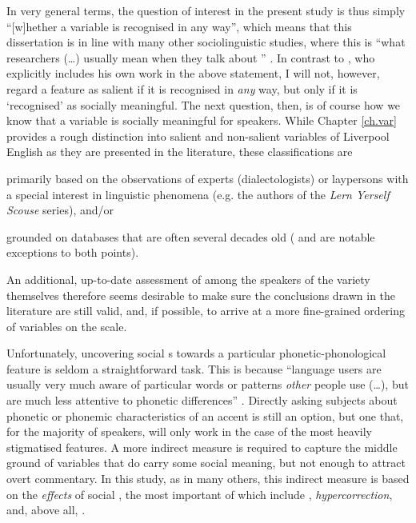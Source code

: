 In very general terms, the question of interest in the present study is thus simply ``[w]hether a variable is recognised in any way'', which means that this dissertation is in line with many other sociolinguistic studies, where this is ``what researchers (\dots) usually mean when they talk about \emph{}'' \parencite[4, emphasis in original]{racz2013}.
In contrast to \textcite{racz2013}, who explicitly includes his own work in the above statement, I will not, however, regard a feature as salient if it is recognised in \emph{any} way, but only if it is `recognised' as socially meaningful.
The next question, then, is of course how we know that a variable is socially meaningful for speakers.
While Chapter \ref{ch.var} provides a rough distinction into salient and non-salient variables of Liverpool English as they are presented in the literature, these classifications are
\begin{inparaenum}[(1)]
	\item primarily based on the observations of experts (dialectologists) or laypersons with a special interest in linguistic phenomena (e.g. the authors of the \emph{Lern Yerself Scouse} series), and/or
	\item grounded on databases that are often several decades old (\citealt{watsonclark2013} and \citealt{watsonclark2015} are notable exceptions to both points).
\end{inparaenum}
An additional, up-to-date assessment of  among the speakers of the variety themselves therefore seems desirable to make sure the conclusions drawn in the literature are still valid, and, if possible, to arrive at a more fine-grained ordering of variables on the  scale.

Unfortunately, uncovering social s towards a particular phonetic-phonological feature is seldom a straightforward task.
This is because ``language users are usually very much aware of particular words or  patterns \emph{other} people use (\ldots), but are much less attentive to phonetic differences'' \parencite[3, emphasis in the original]{racz2013}.
Directly asking subjects about phonetic or phonemic characteristics of an accent is still an option, but one that, for the majority of speakers, will only work in the case of the most heavily stigmatised features.
A more indirect measure is required to capture the middle ground of variables that do carry some social meaning, but not enough to attract overt commentary.
In this study, as in many others, this indirect measure is based on the \emph{effects} of social , the most important of which include \emph{}, \emph{hypercorrection}, and, above all, \emph{}.

